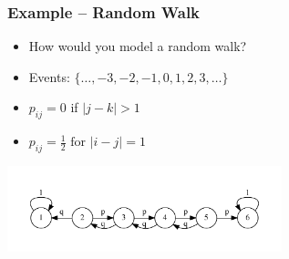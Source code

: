 \documentclass[10pt]{beamer}
\begin{document}
\begin{frame}
  \frametitle{Example -- Random Walk}
  \begin{itemize}
  \item How would you model a random walk? \pause
  \item Events: $\{ \ldots, -3, -2, -1, 0, 1, 2, 3, \ldots \}$
  \item $p_{ij} = 0$ if $|j-k| > 1$
  \item $p_{ij} = \frac{1}{2} \mbox{ for } |i-j| = 1$
  \end{itemize}
  \centerline{\includegraphics[height=2.5cm]{basic-mc}}
\end{frame}
\end{document}

